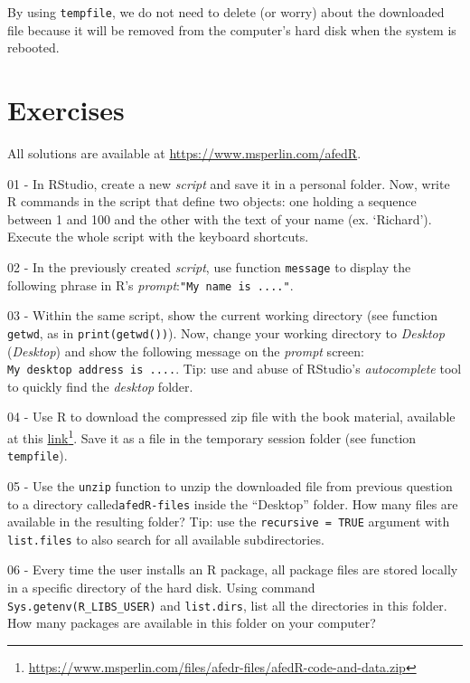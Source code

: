 \documentclass[
  12pt,
]{book}
\begin{document}
By using \texttt{tempfile}, we do not need to delete (or worry) about the downloaded file because it will be removed from the computer's hard disk when the system is rebooted.

\hypertarget{exercises-basic-exercises}{%
\section{Exercises}\label{exercises-basic-exercises}}

All solutions are available at \url{https://www.msperlin.com/afedR}.

01 -
In RStudio, create a new \emph{script} and save it in a personal folder. Now, write R commands in the script that define two objects: one holding a sequence between 1 and 100 and the other with the text of your name (ex. `Richard'). Execute the whole script with the keyboard shortcuts.

02 -
In the previously created \emph{script}, use function \texttt{message} to display the following phrase in R's \emph{prompt}:\texttt{"My\ name\ is\ ...."}.

03 -
Within the same script, show the current working directory (see function \texttt{getwd}, as in \texttt{print(getwd())}). Now, change your working directory to \emph{Desktop} (\emph{Desktop}) and show the following message on the \emph{prompt} screen: \texttt{\textquotesingle{}My\ desktop\ address\ is\ ....\textquotesingle{}}. Tip: use and abuse of RStudio's \emph{autocomplete} tool to quickly find the \emph{desktop} folder.

04 -
Use R to download the compressed zip file with the book material, available at this \href{https://www.msperlin.com/files/afedr-files/afedR-code-and-data.zip}{link}\footnote{\url{https://www.msperlin.com/files/afedr-files/afedR-code-and-data.zip}}. Save it as a file in the temporary session folder (see function \texttt{tempfile}).

05 -
Use the \texttt{unzip} function to unzip the downloaded file from previous question to a directory called\texttt{\textquotesingle{}afedR-files\textquotesingle{}} inside the ``Desktop'' folder. How many files are available in the resulting folder? Tip: use the \texttt{recursive\ =\ TRUE} argument with \texttt{list.files} to also search for all available subdirectories.

06 -
Every time the user installs an R package, all package files are stored locally in a specific directory of the hard disk. Using command \texttt{Sys.getenv(\textquotesingle{}R\_LIBS\_USER\textquotesingle{})} and \texttt{list.dirs}, list all the directories in this folder. How many packages are available in this folder on your computer?
\end{document}

